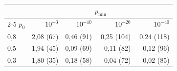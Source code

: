\begin{tabular}{lrrrr}
\toprule
& \multicolumn{4}{c}{$p_{\min}$} \\ \cmidrule(l){2-5}
$p_0$ & $10^{-3}$ & $10^{-10}$ & $10^{-20}$ & $10^{-40}$ \\ \midrule
0{,}8 & 2{,}08 (67) & 0{,}46 (91) & 0{,}25 (104) & 0{,}24 (118) \\
0{,}5 & 1{,}94 (45) & 0{,}09 (69) & $-$0{,}11 (82) & $-$0{,}12 (96) \\
0{,}3 & 1{,}80 (35) & 0{,}18 (58) & 0{,}04 (72) & 0{,}02 (85) \\
\bottomrule
\end{tabular}
